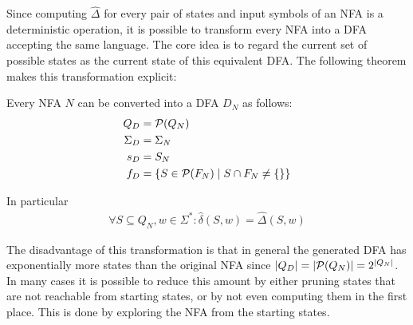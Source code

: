 Since computing $\hat\Delta$ for every pair of states and input symbols of an NFA
is a deterministic operation,
it is possible to transform every NFA into a DFA accepting the same language.
The core idea is to regard the current set of possible states as the current state of
this equivalent DFA.
The following theorem makes this transformation explicit:

\begin{theorem}
    Every NFA $N$ can be converted into a DFA $D_N$ as follows:
    \begin{align}
        Q_D &= \mathcal{P}(Q_N) \\
        \Sigma_D &= \Sigma_N \\
        s_D &= S_N \\
        f_D &= \{ S \in \mathcal{P}(F_N) \mid S \cap F_N \neq \{\} \} \\
    \end{align}

    In particular
    \begin{align}
        \forall S \subseteq Q_N, w \in \Sigma^\ast: \hat\delta(S, w) = \hat\Delta(S, w)
    \end{align}
\end{theorem}

The disadvantage of this transformation is that
in general the generated DFA has exponentially more states
than the original NFA since $|Q_D| = |\mathcal{P}(Q_N)| = 2^{|Q_N|}$.
In many cases it is possible to reduce this amount by either pruning states
that are not reachable from starting states,
or by not even computing them in the first place.
This is done by exploring the NFA from the starting states.
